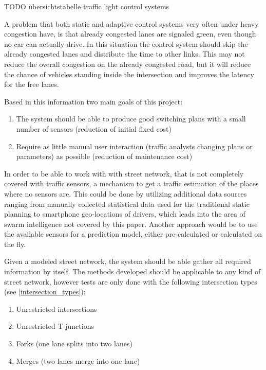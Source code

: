 TODO übersichtstabelle traffic light control systems

A problem that both static and adaptive control systems very often under heavy congestion have, is that already congested lanes are signaled green, even though no car can actually drive. In this situation the control system should skip the already congested lanes and distribute the time to other links. This may not reduce the overall congestion on the already congested road, but it will reduce the chance of vehicles standing inside the intersection and improves the latency for the free lanes.

Based in this information two main goals of this project:

\begin{enumerate}
	\item The system should be able to produce good switching plans with a small number of sensors (reduction of initial fixed cost)
	\item Require as little manual user interaction (traffic analysts changing plans or parameters) as possible (reduction of maintenance cost)
\end{enumerate}

In order to be able to work with with street network, that is not completely covered with traffic sensors, a mechanism to get a traffic estimation of the places where no sensors are. This could be done by utilizing additional data sources ranging from manually collected statistical data used for the traditional static planning to smartphone geo-locations of drivers, which leads into the area of swarm intelligence not covered by this paper. Another approach would be to use the available sensors for a prediction model, either pre-calculated or calculated on the fly.

Given a modeled street network, the system should be able gather all required information by itself. The methods developed should be applicable to any kind of street network, however tests are only done with the following intersection types (see \autoref{intersection_types}):

\begin{enumerate}
	\item Unrestricted intersections
	\item Unrestricted T-junctions
	\item Forks (one lane splits into two lanes)
	\item Merges (two lanes merge into one lane)
\end{enumerate}

